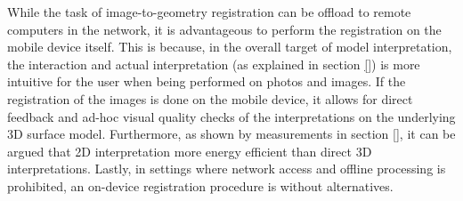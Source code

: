 \documentclass[review]{elsarticle}
\begin{document}

While the task of image-to-geometry registration can be offload to remote computers in the network, it is advantageous to perform the registration on the mobile device itself. This is because, in the overall target of model interpretation, the interaction and actual interpretation (as explained in section \ref{}) is more intuitive for the user when being performed on photos and images. If the registration of the images is done on the mobile device, it allows for direct feedback and ad-hoc visual quality checks of the interpretations on the underlying 3D surface model. Furthermore, as shown by measurements in section \ref{}, it can be argued that 2D interpretation more energy efficient than direct 3D interpretations. Lastly, in settings where network access and offline processing is prohibited, an on-device registration procedure is without alternatives.
\end{document}
